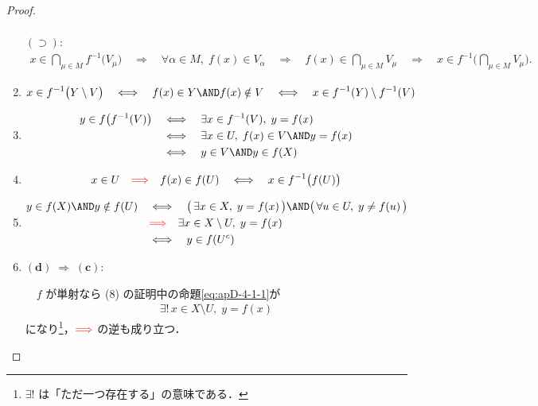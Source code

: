 \documentclass[geometry_main]{subfiles}
\begin{document}
\begin{proof}
\begin{enumerate}
\begin{align}
        \end{align}
        $\bm{(\supset):}$
        \begin{align}
            x \in \bigcap_{\mu \in M} f^{-1} \Biggl(V_\mu\Biggr)\quad \Longrightarrow\quad \forall \alpha \in M,\; f(x) \in V_\alpha \quad \Longrightarrow\quad f(x) \in \bigcap_{\mu \in M} V_\mu \quad \Longrightarrow\quad x \in f^{-1} \Biggl(\bigcap_{\mu \in M} V_\mu\Biggr).
        \end{align}
        \item
        \begin{align}
            x \in f^{-1} \bigl( Y \setminus V \bigr) \quad \Longleftrightarrow\quad f(x) \in Y \AND f(x) \notin V \quad \Longleftrightarrow\quad x \in f^{-1}(Y) \setminus f^{-1}(V)
        \end{align}
        \item 
        \begin{align}
            y \in f \bigl( f^{-1}(V) \bigr)  \quad &\Longleftrightarrow\quad \exists x \in f^{-1}(V),\; y = f(x) \\
            &\Longleftrightarrow\quad \exists x \in U,\; f(x) \in V \AND y = f(x) \\
            &\Longleftrightarrow\quad y \in V \AND y \in f(X)
        \end{align}
        \item 
        \begin{align}
            x \in U \quad \textcolor{red}{\Longrightarrow}\quad f(x) \in f(U) \quad \Longleftrightarrow\quad x \in f^{-1}\bigl( f(U) \bigr) 
        \end{align}
        \item 
        \begin{align}
            y \in f(X) \AND y \notin f(U) \quad &\Longleftrightarrow\quad \bigl(\, \exists x \in X,\; y = f(x) \, \bigr) \AND \bigl(\, \forall u \in U,\; y \neq f(u)\, \bigr) \\
            &\textcolor{red}{\Longrightarrow}\quad \exists x \in X \setminus U,\; y = f(x) \label{eq:apD-4-1-1}\\
            &\Longleftrightarrow\quad y \in f(U^c)
        \end{align}
        \item $\bm{(d) \; \Longrightarrow\; (c):}$ 
        
        　$f$ が単射なら (8) の証明中の命題\eqref{eq:apD-4-1-1}が
        \begin{align}
            \exists !\, x \in X \setminus U,\; y = f(x)
        \end{align}
        になり\footnote{$\exists !$ は「ただ一つ存在する」の意味である．}，$\textcolor{red}{\Longrightarrow}$ の逆も成り立つ．


\end{enumerate}
\end{proof}
\end{document}
